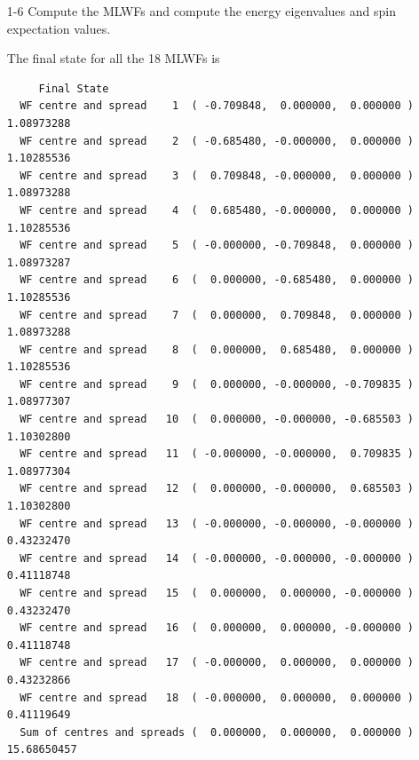 \begin{itemize}
	\item[1-6] {Compute the MLWFs and compute the energy eigenvalues and spin expectation values.} 

	The final state for all the 18 MLWFs is  
	\begin{tcolorbox}[sharp corners,boxrule=0.5pt]
	{\small
	\begin{verbatim}
	 Final State
  WF centre and spread    1  ( -0.709848,  0.000000,  0.000000 )     1.08973288
  WF centre and spread    2  ( -0.685480, -0.000000,  0.000000 )     1.10285536
  WF centre and spread    3  (  0.709848, -0.000000,  0.000000 )     1.08973288
  WF centre and spread    4  (  0.685480, -0.000000,  0.000000 )     1.10285536
  WF centre and spread    5  ( -0.000000, -0.709848,  0.000000 )     1.08973287
  WF centre and spread    6  (  0.000000, -0.685480,  0.000000 )     1.10285536
  WF centre and spread    7  (  0.000000,  0.709848,  0.000000 )     1.08973288
  WF centre and spread    8  (  0.000000,  0.685480,  0.000000 )     1.10285536
  WF centre and spread    9  (  0.000000, -0.000000, -0.709835 )     1.08977307
  WF centre and spread   10  (  0.000000, -0.000000, -0.685503 )     1.10302800
  WF centre and spread   11  ( -0.000000, -0.000000,  0.709835 )     1.08977304
  WF centre and spread   12  (  0.000000, -0.000000,  0.685503 )     1.10302800
  WF centre and spread   13  ( -0.000000, -0.000000, -0.000000 )     0.43232470
  WF centre and spread   14  ( -0.000000, -0.000000, -0.000000 )     0.41118748
  WF centre and spread   15  (  0.000000,  0.000000, -0.000000 )     0.43232470
  WF centre and spread   16  (  0.000000,  0.000000, -0.000000 )     0.41118748
  WF centre and spread   17  ( -0.000000,  0.000000,  0.000000 )     0.43232866
  WF centre and spread   18  ( -0.000000,  0.000000,  0.000000 )     0.41119649
  Sum of centres and spreads (  0.000000,  0.000000,  0.000000 )    15.68650457


\end{verbatim}}
\end{tcolorbox}
\end{itemize}
